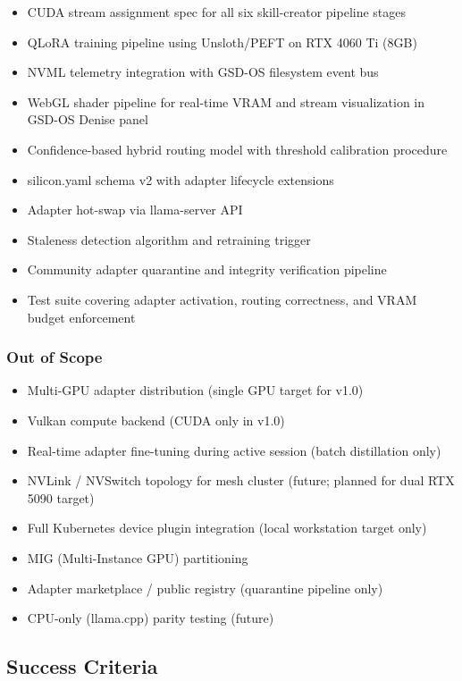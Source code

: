 \documentclass[11pt,letterpaper]{article}
\begin{document}
\begin{itemize}[leftmargin=*]
  \item CUDA stream assignment spec for all six skill-creator pipeline stages
  \item QLoRA training pipeline using Unsloth/PEFT on RTX 4060 Ti (8GB)
  \item NVML telemetry integration with GSD-OS filesystem event bus
  \item WebGL shader pipeline for real-time VRAM and stream visualization in GSD-OS Denise panel
  \item Confidence-based hybrid routing model with threshold calibration procedure
  \item silicon.yaml schema v2 with adapter lifecycle extensions
  \item Adapter hot-swap via llama-server API
  \item Staleness detection algorithm and retraining trigger
  \item Community adapter quarantine and integrity verification pipeline
  \item Test suite covering adapter activation, routing correctness, and VRAM budget enforcement
\end{itemize}

\subsubsection{Out of Scope}

\begin{itemize}[leftmargin=*]
  \item Multi-GPU adapter distribution (single GPU target for v1.0)
  \item Vulkan compute backend (CUDA only in v1.0)
  \item Real-time adapter fine-tuning during active session (batch distillation only)
  \item NVLink / NVSwitch topology for mesh cluster (future; planned for dual RTX 5090 target)
  \item Full Kubernetes device plugin integration (local workstation target only)
  \item MIG (Multi-Instance GPU) partitioning
  \item Adapter marketplace / public registry (quarantine pipeline only)
  \item CPU-only (llama.cpp) parity testing (future)
\end{itemize}

\subsection{Success Criteria}
\end{document}
